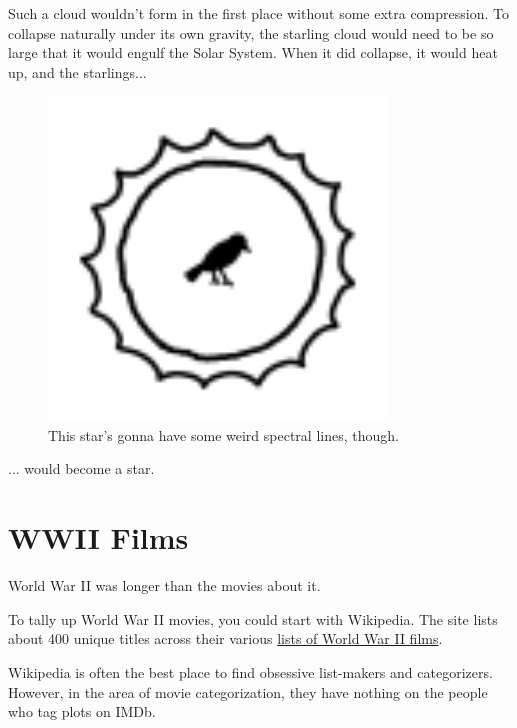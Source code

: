 {{Such a cloud wouldn't form in the first place without some extra compression. To collapse naturally under its own gravity, the starling cloud would need to be so large that it would engulf the Solar System. When it did collapse, it would heat up, and the starlings...}

\begin{figure}[!htbp]
\centering
\includegraphics[scale=0.5, max width=0.8\textwidth]{imgs/a/99/birdsun.png}
\caption{This star's gonna have some weird spectral lines, though.}
\end{figure}

{... would become a star.}

{
\chapter{WWII Films}
}

\hfill{}

{World War II was longer than the movies about it.}

{To tally up World War II movies, you could start with Wikipedia. The site lists about 400 unique titles across their various \href{http://en.wikipedia.org/wiki/Category:World\_War\_II\_films}{lists of World War II films}.}

{Wikipedia is often the best place to find obsessive list-makers and categorizers. However, in the area of movie categorization, they have nothing on the people who tag plots on IMDb.}

}
